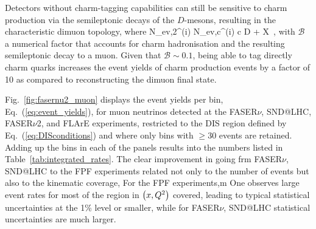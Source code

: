   Detectors without charm-tagging capabilities can still be sensitive to charm production via
  the semileptonic decays of the $D$-mesons, resulting in the characteristic
  dimuon topology, where
  \be
 N_{\rm ev,2\mu}^{(i)} \approx N_{\rm ev,c}^{(i)} \times {}\lp c \to D \to \mu + X\rp \, ,
 \ee
 with $\mathcal{B}$ a numerical factor that accounts for charm hadronisation and the
 resulting semileptonic decay to a muon.
 Given that $\mathcal{B}\sim 0.1$, being able to tag directly charm quarks increases the event yields
 of charm production events by a factor of 10 as compared to reconstructing the dimuon final state.

 Fig.~\ref{fig:fasernu2_muon} displays the
 event yields per bin,  Eq.~(\ref{eq:event_yields}),
 for muon neutrinos detected at the
 FASER$\nu$, SND@LHC, FASER$\nu$2, and FLArE  experiments,
 restricted
 to the DIS region defined by Eq.~(\ref{eq:DISconditions})
 and where only bins with $\ge 30$ events are retained.
 Adding up the bins in each of the panels results into the numbers listed in
 Table~\ref{tab:integrated_rates}.
 The clear improvement in going frm FASER$\nu$, SND@LHC
 to the FPF experiments related not only to the number
 of events but also to the kinematic coverage,
 For the FPF experiments,m 
 One observes large event rates for most of the region in $\left( x,Q^2\right)$ covered,
 leading to typical statistical uncertainties at the 1\% level or smaller,
 while for FASER$\nu$, SND@LHC statistical uncertainties are much larger.
  
